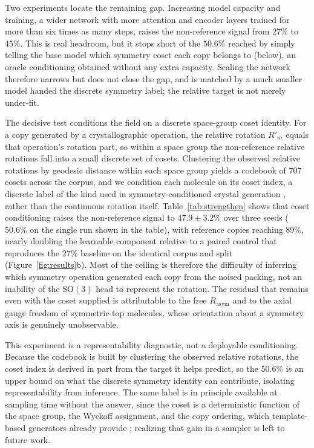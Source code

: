 \documentclass[10pt]{article}
\begin{document}
Two experiments locate the remaining gap. Increasing model capacity and
training, a wider network with more attention and encoder layers trained for more
than six times as many steps, raises the non-reference signal from $27\%$ to
$45\%$. This is real headroom, but it stops short of the $50.6\%$ reached by simply
telling the base model which symmetry coset each copy belongs to (below), an
oracle conditioning obtained without any extra capacity. Scaling the network
therefore narrows but does not close the gap, and is matched by a much smaller
model handed the discrete symmetry label; the relative target is not merely
under-fit.

The decisive test conditions the field on a discrete space-group coset identity.
For a copy generated by a crystallographic operation, the relative rotation
$R'_m$ equals that operation's rotation part, so within a space group the
non-reference relative rotations fall into a small discrete set of cosets.
Clustering the observed relative rotations by geodesic distance within each space
group yields a codebook of $707$ cosets across the corpus, and we condition each
molecule on its coset index, a discrete label of the kind used in
symmetry-conditioned crystal
generation \citep{jiao2024diffcsppp,wyckoffdiff2025,symmcd2025}, rather than the
continuous rotation itself. Table~\ref{tab:strengthen} shows that coset
conditioning raises the non-reference signal to $47.9\pm3.2\%$ over three seeds
($50.6\%$ on the single run shown in the table), with reference copies
reaching $89\%$, nearly doubling the learnable component relative to a paired
control that reproduces the $27\%$ baseline on the identical corpus and split
(Figure~\ref{fig:results}b). Most of the ceiling is therefore the difficulty of
inferring which symmetry
operation generated each copy from the noised packing, not an inability of the
$\mathrm{SO}(3)$ head to represent the rotation. The residual that remains even
with the coset supplied is attributable to the free $R_{\text{asym}}$ and to the
axial gauge freedom of symmetric-top molecules, whose orientation about a
symmetry axis is genuinely unobservable.

This experiment is a representability diagnostic, not a deployable conditioning.
Because the codebook is built by clustering the observed relative rotations, the
coset index is derived in part from the target it helps predict, so the $50.6\%$ is
an upper bound on what the discrete symmetry identity can contribute, isolating
representability from inference. The same label is in principle available at
sampling time without the answer, since the coset is a deterministic function of
the space group, the Wyckoff assignment, and the copy ordering, which
template-based generators already provide \citep{jiao2024diffcsppp,wyckoffdiff2025,symmcd2025};
realizing that gain in a sampler is left to future work.
\end{document}
